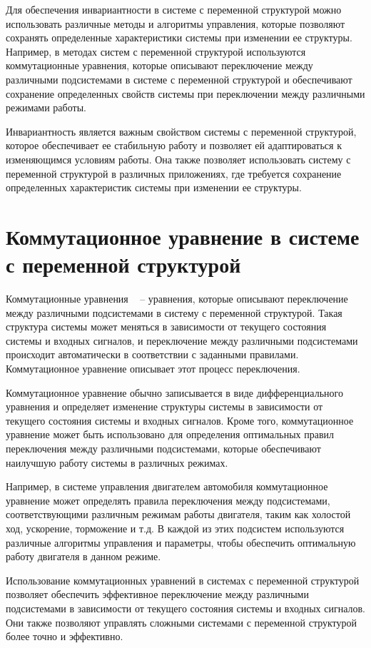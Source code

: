 Для обеспечения инвариантности в системе с переменной структурой можно использовать различные методы и алгоритмы управления, которые позволяют сохранять определенные характеристики системы при изменении ее структуры. Например, в методах систем с переменной структурой используются коммутационные уравнения, которые описывают переключение между различными подсистемами в системе с переменной структурой и обеспечивают сохранение определенных свойств системы при переключении между различными режимами работы.

Инвариантность является важным свойством системы с переменной структурой, которое обеспечивает ее стабильную работу и позволяет ей адаптироваться к изменяющимся условиям работы. Она также позволяет использовать систему с переменной структурой в различных приложениях, где требуется сохранение определенных характеристик системы при изменении ее структуры.

\section{Коммутационное уравнение в системе с переменной структурой} 
  Коммутационные уравнения ~\cite{15} -- уравнения, которые описывают переключение между различными подсистемами в систему с переменной структурой. Такая структура системы может меняться в зависимости от текущего состояния системы и входных сигналов, и переключение между различными подсистемами происходит автоматически в соответствии с заданными правилами. Коммутационное уравнение описывает этот процесс переключения.

Коммутационное уравнение обычно записывается в виде дифференциального уравнения и определяет изменение структуры системы в зависимости от текущего состояния системы и входных сигналов. Кроме того, коммутационное уравнение может быть использовано для определения оптимальных правил переключения между различными подсистемами, которые обеспечивают наилучшую работу системы в различных режимах.

Например, в системе управления двигателем автомобиля коммутационное уравнение может определять правила переключения между подсистемами, соответствующими различным режимам работы двигателя, таким как холостой ход, ускорение, торможение и т.д. В каждой из этих подсистем используются различные алгоритмы управления и параметры, чтобы обеспечить оптимальную работу двигателя в данном режиме.

Использование коммутационных уравнений в системах с переменной структурой позволяет обеспечить эффективное переключение между различными подсистемами в зависимости от текущего состояния системы и входных сигналов. Они также позволяют управлять сложными системами с переменной структурой более точно и эффективно.


